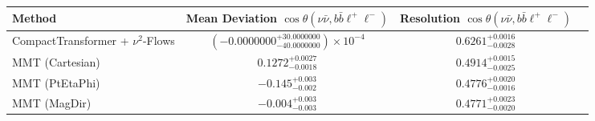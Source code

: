     \begin{tabular}{lccc}
        \toprule
        Method & Mean Deviation $\cos\theta(\nu\bar{\nu}, b\bar{b}\ell^+\ell^-)$ & Resolution $\cos\theta(\nu\bar{\nu}, b\bar{b}\ell^+\ell^-)$ \\
        \midrule
        CompactTransformer + $\nu^2$-Flows & $(-0.0000000^{+30.0000000}_{-40.0000000})\times 10^{-4}$ & $0.6261^{+0.0016}_{-0.0028}$ \\
        MMT (Cartesian) & $0.1272^{+0.0027}_{-0.0018}$ & $0.4914^{+0.0015}_{-0.0025}$ \\
        MMT (PtEtaPhi) & $-0.145^{+0.003}_{-0.002}$ & $0.4776^{+0.0020}_{-0.0016}$ \\
        MMT (MagDir) & $-0.004^{+0.003}_{-0.003}$ & $0.4771^{+0.0023}_{-0.0020}$ \\
        \bottomrule
    \end{tabular}